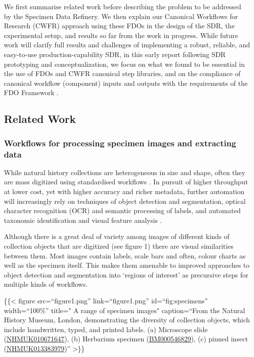 We first summarise related work before describing the problem to be
addressed by the Specimen Data Refinery. We then explain our Canonical
Workflows for Research (CWFR) approach using these FDOs in the design of
the SDR, the experimental setup, and results so far from the work in
progress. While future work will clarify full results and challenges of
implementing a robust, reliable, and easy-to-use production-capability
SDR, in this early report following SDR prototyping and
conceptualization, we focus on what we found to be essential in the use
of FDOs and CWFR canonical step libraries, and on the compliance of
canonical workflow (component) inputs and outputs with the requirements
of the FDO Framework \cite{bonino2019}.

\hypertarget{related-work}{%
\subsection{Related Work}\label{related-work}}

\hypertarget{workflows-for-processing-specimen-images-and-extracting-data}{%
\subsubsection{Workflows for processing specimen images and
extracting
data}\label{workflows-for-processing-specimen-images-and-extracting-data}}

While natural history collections are heterogeneous in size and shape,
often they are mass digitized using standardised workflows \cite{ch8-9,ch8-10,ch8-11,ch8-12,ch8-13}.
In pursuit of higher throughput at lower cost, yet with higher accuracy
and richer metadata, further automation will increasingly rely on
techniques of object detection and segmentation, optical character
recognition (OCR) and semantic processing of labels, and automated
taxonomic identification and visual feature analysis \cite{Walton 2020,ch8-18}.

Although there is a great deal of variety among images of different
kinds of collection objects that are digitized (see figure 1) there are
visual similarities between them. Most images contain labels, scale bars
and often, colour charts as well as the specimen itself. This makes them
amenable to improved approaches to object detection \cite{ch8-32} and
segmentation into `regions of interest' \cite{ch8-33} as precursive steps for
multiple kinds of workflows.

\{\{\textless{} figure src=``figure1.png'' link=``figure1.png''
id=``fig:specimens'' width=``100\%'' title=" A range of specimen images"
caption=``From the Natural History Museum, London, demonstrating the
diversity of collection objects, which include handwritten, typed, and
printed labels. (a) Microscope slide
(\href{https://data.nhm.ac.uk/object/c65d9a3c-d8f6-4fac-a418-05c3b697cece}{NHMUK010671647}),
(b) Herbarium specimen
(\href{https://data.nhm.ac.uk/object/be595f07-73c5-4764-a96c-8b377e3d1507}{BM000546829}),
(c) pinned insect
(\href{https://data.nhm.ac.uk/object/745febc7-8222-498a-9969-5f6b12f85ef3}{NHMUK013383979})''
\textgreater\}\}

